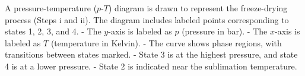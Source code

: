 A pressure-temperature (\( p \)-\( T \)) diagram is drawn to represent the freeze-drying process (Steps i and ii). The diagram includes labeled points corresponding to states 1, 2, 3, and 4.  
- The \( y \)-axis is labeled as \( p \) (pressure in bar).  
- The \( x \)-axis is labeled as \( T \) (temperature in Kelvin).  
- The curve shows phase regions, with transitions between states marked.  
- State 3 is at the highest pressure, and state 4 is at a lower pressure.  
- State 2 is indicated near the sublimation temperature.